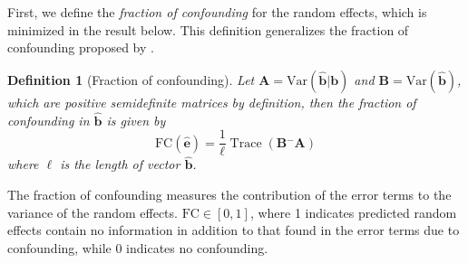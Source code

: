 \documentclass[12pt]{article} %
\newtheorem{definition}{Definition}
\newcommand{\ginv}{\ensuremath{^{-}}}
\newcommand{\trans}{\ensuremath{^\prime}}
\newcommand{\var}{\ensuremath{\mathrm{Var}}}
\DeclareMathOperator{\tr}{Trace}
\begin{document}
First, we define the \emph{fraction of confounding} for the random effects, which is minimized in the result below. This definition generalizes the fraction of confounding proposed by \cite{HildenMinton:1995wh}. \\

%



\begin{definition}[Fraction of confounding]
Let $\bm{A} = \var(\widehat{\bm{b}} | \bm{b} )$ and $\bm{B} = \var(\widehat{\bm{b}})$, which are positive semidefinite matrices by definition, then the fraction of confounding in $\widehat{\bm{b}}$ is given by
%
\begin{equation}\label{eq:fc2}
\text{FC}(\widehat{\bm{e}}) = \frac{1}{\ell} \tr\left( \bm{B}\ginv\bm{A} \right)
\end{equation}
where $\ell$ is the length of vector $\widehat{\bm{b}}$.
\end{definition}
The fraction of confounding measures the contribution of the error terms  to the variance of the random effects. $\text{FC} \in [0,1]$, where 1 indicates predicted random effects contain no information in addition to that found in the error terms due to confounding, while 0 indicates no confounding. 
\end{document}
